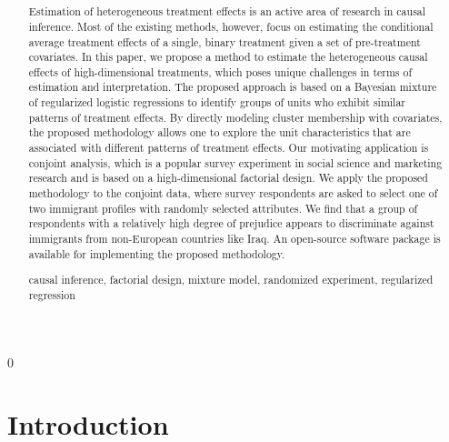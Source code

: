 \documentclass[11pt]{article}
\newcommand\spacingset[1]{\renewcommand{\baselinestretch}%
  {#1}\small\normalsize}
\newcommand{\blind}{0}
\begin{document}
\blind
\title{\bf \tit}

\maketitle
\fi

\setcounter{page}{0}
\thispagestyle{empty}
\vspace{-1em}
\begin{abstract}

  Estimation of heterogeneous treatment effects is an active area of
  research in causal inference.  Most of the existing methods,
  however, focus on estimating the conditional average treatment
  effects of a single, binary treatment given a set of pre-treatment
  covariates.  In this paper, we propose a method to estimate the
  heterogeneous causal effects of high-dimensional treatments, which
  poses unique challenges in terms of estimation and interpretation.
  The proposed approach is based on a Bayesian mixture of regularized logistic
  regressions to identify groups of units who exhibit similar patterns
  of treatment effects.  By directly modeling cluster membership with
  covariates, the proposed methodology allows one to explore the unit
  characteristics that are associated with different patterns of
  treatment effects.  Our motivating application is conjoint analysis,
  which is a popular survey experiment in social science and marketing
  research and is based on a high-dimensional factorial design.  We
  apply the proposed methodology to the conjoint data, where survey
  respondents are asked to select one of two immigrant profiles with
  randomly selected attributes.  We find that a group of respondents
  with a relatively high degree of prejudice appears to discriminate
  against immigrants from non-European countries like Iraq. An
  open-source software package is available for implementing the
  proposed methodology.

  \bigskip
{} causal inference, factorial design, mixture model, randomized experiment, regularized regression
  
\end{abstract}


\section{Introduction}
\spacingset{1.375}
\end{document}
